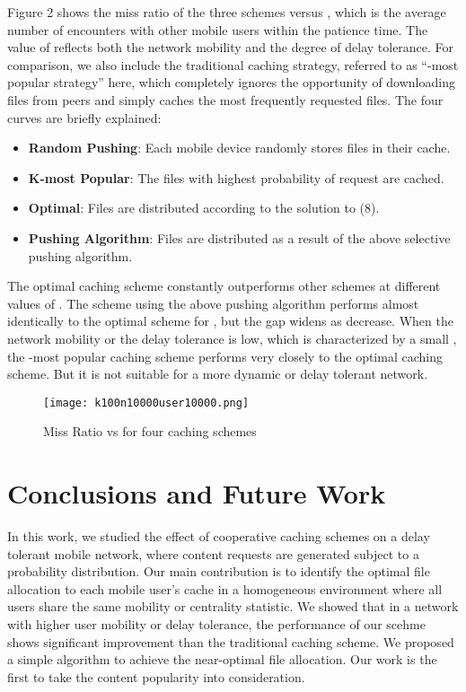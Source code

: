 \documentclass{sig-alternate}
\begin{document}
Figure 2 shows the miss ratio of the three schemes versus , which is the average number of encounters with other mobile users within the patience time. The value of  reflects both the network mobility and the degree of delay tolerance. For comparison, we also include the traditional caching strategy, referred to as ``-most popular strategy'' here, which completely ignores the opportunity of downloading files from peers and simply caches the  most frequently requested files. The four curves are briefly explained:

\begin{itemize}
	\item	\textbf{Random Pushing}: Each mobile device randomly stores  files in their cache.
	\item \textbf{K-most Popular}: The  files with highest probability of request are cached. 
	\item \textbf{Optimal}: Files are distributed according to the solution to (8).
	\item \textbf{Pushing Algorithm}: Files are distributed as a result of the above selective pushing algorithm.
	
	\end{itemize}
 
The optimal caching scheme constantly outperforms other schemes at different values of . The scheme using the above pushing algorithm performs almost identically to the optimal scheme for , but the gap widens as  decrease. When the network mobility or the delay tolerance is low, which is characterized by a small , the -most popular caching scheme performs very closely to the optimal caching scheme. But it is not suitable for a more dynamic or delay tolerant network.

\begin{figure}
	\centering
		\texttt{[image: k100n10000user10000.png]}
	\caption{Miss Ratio vs  for four caching schemes} 
	\label{fig:k100n1000user10000}
\end{figure}


\section{Conclusions and Future Work}

In this work, we studied the effect of cooperative caching schemes on a delay tolerant mobile network, where content requests are generated subject to a probability distribution. Our main contribution is to identify the optimal file allocation to each mobile user's cache in a homogeneous environment where all users share the same mobility or centrality statistic. We showed that in a network with higher user mobility or delay tolerance, the performance of our scehme shows significant improvement than the traditional caching scheme. We proposed a simple algorithm to achieve the near-optimal file allocation. Our work is the first to take the content popularity into consideration. 
\end{document}

